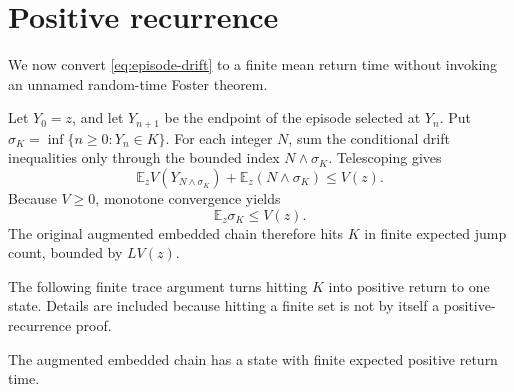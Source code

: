\section{Positive recurrence}\label{sec:recurrence}

We now convert \eqref{eq:episode-drift} to a finite mean return time without
invoking an unnamed random-time Foster theorem.

Let \(Y_0=z\), and let \(Y_{n+1}\) be the endpoint of the episode selected at
\(Y_n\).  Put
\(
 \sigma_K=\inf\{n\ge0:Y_n\in K\}.
\)
For each integer \(N\), sum the conditional drift inequalities only through
the bounded index \(N\wedge\sigma_K\).  Telescoping gives
\begin{equation}\label{eq:stopped-drift}
  \mathbb E_zV(Y_{N\wedge\sigma_K})
  +\mathbb E_z(N\wedge\sigma_K)
  \le V(z).
\end{equation}
Because \(V\ge0\), monotone convergence yields
\begin{equation}\label{eq:episodes-to-K}
  \mathbb E_z\sigma_K\le V(z).
\end{equation}
The original augmented embedded chain therefore hits \(K\) in finite
expected jump count, bounded by \(L V(z)\).

The following finite trace argument turns hitting \(K\) into positive return
to one state.  Details are included because hitting a finite set is not by
itself a positive-recurrence proof.

\begin{proposition}\label{prop:trace}
The augmented embedded chain has a state with finite expected positive return
time.
\end{proposition}

